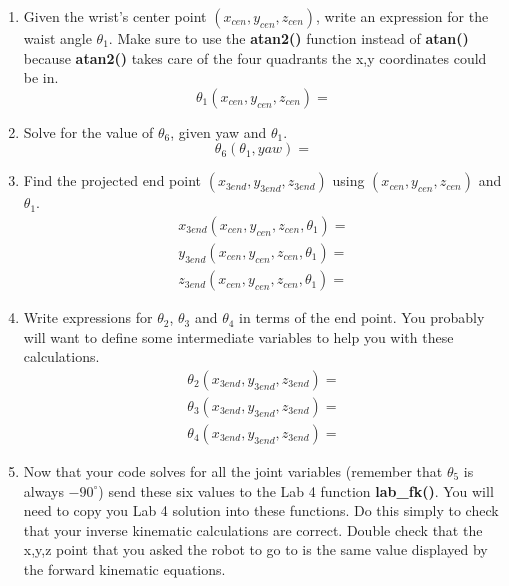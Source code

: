 \begin{itemize}
\begin{enumerate}
\item Given the wrist's center point $(x_{cen},y_{cen},z_{cen})$, write an expression for the waist angle $\theta_1$.  Make sure to use the \textbf{atan2()} 
function instead of \textbf{atan()} because \textbf{atan2()} takes care of the four quadrants the x,y coordinates could be in.  
\begin{equation}
	\theta_1(x_{cen},y_{cen},z_{cen}) = 
\end{equation}
\item Solve for the value of $\theta_6$, given yaw and $\theta_1$.
\begin{equation}
	\theta_6(\theta_1,yaw) = 
\end{equation}
\item Find the projected end point $(x_{3end},y_{3end},z_{3end})$ using $(x_{cen},y_{cen},z_{cen})$ and $\theta_1$.  
\begin{eqnarray*}
	x_{3end}(x_{cen},y_{cen},z_{cen},\theta_1) =\\
	y_{3end}(x_{cen},y_{cen},z_{cen},\theta_1) =\\
	z_{3end}(x_{cen},y_{cen},z_{cen},\theta_1) = 
\end{eqnarray*}

\item Write expressions for $\theta_2$, $\theta_3$ and $\theta_4$ in terms of the end point.  You probably will want to define some intermediate
variables to help you with these calculations.
\begin{eqnarray*}
	\theta_2(x_{3end},y_{3end},z_{3end}) =\\
	\theta_3(x_{3end},y_{3end},z_{3end}) =\\
	\theta_4(x_{3end},y_{3end},z_{3end}) = 
\end{eqnarray*}

\item Now that your code solves for all the joint variables (remember that $\theta_5$ is always $-90^{\circ}$) send these six values to the Lab 4 
function \textbf{lab\_fk()}.  You will need to copy you Lab 4 solution into these functions. Do this simply to check that your inverse kinematic calculations are correct. Double check that the x,y,z point that you asked the robot
to go to is the same value displayed by the forward kinematic equations.

\end{enumerate}	
\end{itemize}	

\newpage

